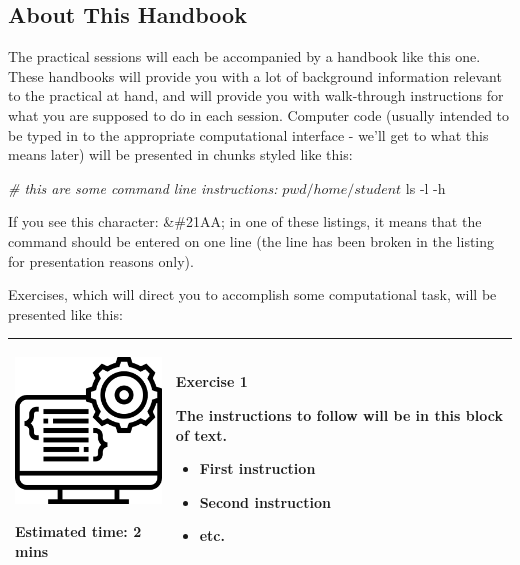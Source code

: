 \documentclass[
  english,
  paper=a4,
  ,captions=tableheading
]{scrartcl}
\newenvironment{Shaded}{\begin{snugshade}}{\end{snugshade}}
\newcommand{\BuiltInTok}[1]{#1}
\newcommand{\CommentTok}[1]{\textcolor[rgb]{0.56,0.35,0.01}{\textit{#1}}}
\newcommand{\ExtensionTok}[1]{#1}
\newcommand{\FunctionTok}[1]{\textcolor[rgb]{0.00,0.00,0.00}{#1}}
\newcommand{\NormalTok}[1]{#1}
\providecommand{\tightlist}{%
  \setlength{\itemsep}{0pt}\setlength{\parskip}{0pt}}
\begin{document}
\hypertarget{about-this-handbook}{%
\subsection{About This Handbook}\label{about-this-handbook}}

The practical sessions will each be accompanied by a handbook like this
one. These handbooks will provide you with a lot of background
information relevant to the practical at hand, and will provide you with
walk-through instructions for what you are supposed to do in each
session. Computer code (usually intended to be typed in to the
appropriate computational interface - we'll get to what this means
later) will be presented in chunks styled like this:

\begin{Shaded}
\begin{Highlighting}[]
\CommentTok{# this are some command line instructions:}
\NormalTok{$ }\BuiltInTok{pwd}
\ExtensionTok{/home/student}
\NormalTok{$ }\FunctionTok{ls}\NormalTok{ -l -h ~}
\end{Highlighting}
\end{Shaded}

If you see this character: \&\#21AA; in one of these listings, it means
that the command should be entered on one line (the line has been broken
in the listing for presentation reasons only).

Exercises, which will direct you to accomplish some computational task,
will be presented like this:

\begin{longtable}[]{@{}ll@{}}
\toprule
\endhead
\begin{minipage}[t]{0.36\columnwidth}\raggedright
\includegraphics[width=1.5625in,height=\textheight]{media/programming.png}

Estimated time: 2 mins\strut
\end{minipage} & \begin{minipage}[t]{0.58\columnwidth}\raggedright
\textbf{Exercise 1}

The instructions to follow will be in this block of text.

\begin{itemize}
\tightlist
\item
  First instruction
\item
  Second instruction
\item
  etc.
\end{itemize}\strut
\end{minipage}\tabularnewline
\bottomrule
\end{longtable}
\end{document}

